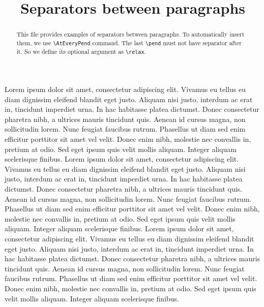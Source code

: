 \documentclass{article}
\begin{document}
\begin{english}
\title{Separators between paragraphs}
\maketitle
\begin{abstract}
This file provides examples of separators between paragraphs.
To automatically insert them, we use \verb+\AtEveryPend+ command.
The last \verb+\pend+ must not have separator after it. So we define its optional argument as \verb+\relax+.

\end{abstract}
\end{english}

\begin{pages}
\begin{Rightside}
\beginnumbering
\pstart
Lorem ipsum dolor sit amet, consectetur adipiscing elit. Vivamus eu tellus eu diam dignissim eleifend blandit eget justo. Aliquam nisi justo, interdum ac erat in, tincidunt imperdiet urna. In hac habitasse platea dictumst. Donec consectetur pharetra nibh, a ultrices mauris tincidunt quis. Aenean id cursus magna, non sollicitudin lorem. Nunc feugiat faucibus rutrum. Phasellus ut diam sed enim efficitur porttitor sit amet vel velit. Donec enim nibh, molestie nec convallis in, pretium at odio. Sed eget ipsum quis velit mollis aliquam. Integer aliquam scelerisque finibus.
\pend
\pstart
Lorem ipsum dolor sit amet, consectetur adipiscing elit. Vivamus eu tellus eu diam dignissim eleifend blandit eget justo. Aliquam nisi justo, interdum ac erat in, tincidunt imperdiet urna. In hac habitasse platea dictumst. Donec consectetur pharetra nibh, a ultrices mauris tincidunt quis. Aenean id cursus magna, non sollicitudin lorem. Nunc feugiat faucibus rutrum. Phasellus ut diam sed enim efficitur porttitor sit amet vel velit. Donec enim nibh, molestie nec convallis in, pretium at odio. Sed eget ipsum quis velit mollis aliquam. Integer aliquam scelerisque finibus.
\pend
\pstart
Lorem ipsum dolor sit amet, consectetur adipiscing elit. Vivamus eu tellus eu diam dignissim eleifend blandit eget justo. Aliquam nisi justo, interdum ac erat in, tincidunt imperdiet urna. In hac habitasse platea dictumst. Donec consectetur pharetra nibh, a ultrices mauris tincidunt quis. Aenean id cursus magna, non sollicitudin lorem. Nunc feugiat faucibus rutrum. Phasellus ut diam sed enim efficitur porttitor sit amet vel velit. Donec enim nibh, molestie nec convallis in, pretium at odio. Sed eget ipsum quis velit mollis aliquam. Integer aliquam scelerisque finibus.

\end{Rightside}
\end{pages}
\end{document}
